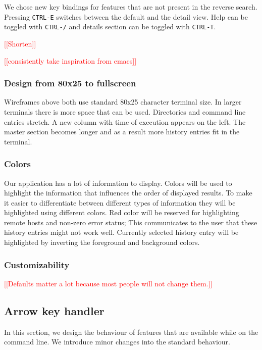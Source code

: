 \documentclass[thesis=M,english]{FITthesis}[2012/10/20]
\newcommand{\redtext}[1]{\textcolor{red}{[[#1]]}}
\begin{document}
We chose new key bindings for features that are not present in the reverse search.
Pressing \verb|CTRL-E| switches between the default and the detail view.
Help can be toggled with \verb|CTRL-/| and details section can be toggled with \verb|CTRL-T|.

\redtext{Shorten}

\redtext{consistently take inspiration from emacs}

\subsubsection{Design from 80x25 to fullscreen}

Wireframes above both use standard 80x25 character terminal size. In larger terminals there is more space that can be used. Directories and command line entries stretch. A new column with time of execution appears on the left. The master section becomes longer and as a result more history entries fit in the terminal.   

\subsubsection{Colors}

Our application has a lot of information to display. 
Colors will be used to highlight the information that influences the order of displayed results. To make it easier to differentiate between different types of information they will be highlighted using different colors. 
Red color will be reserved for highlighting remote hosts and non-zero error status; This communicates to the user that these history entries might not work well.
Currently selected history entry will be highlighted by inverting the foreground and background colors.

\subsubsection{Customizability}

\redtext{Defaults matter a lot because most people will not change them.}

\subsection{Arrow key handler}

In this section, we design the behaviour of features that are available while on the command line. We introduce minor changes into the standard behaviour.
\end{document}
